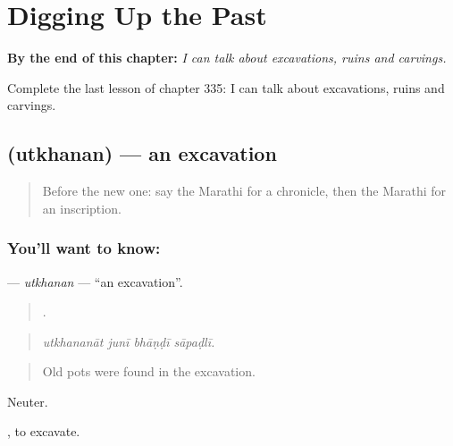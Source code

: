 
\chapter{Digging Up the Past}
\label{ch:mr-digging-up-the-past}

\begin{chapteropening}
\textbf{By the end of this chapter:} \emph{I can talk about excavations, ruins and carvings.}

Complete the last lesson of chapter 335: I can talk about excavations, ruins and carvings.
\end{chapteropening}

\section[\texorpdfstring{\mr{उत्खनन} (utkhanan)}{उत्खनन (utkhanan)}]{ (utkhanan) — an excavation}

\label{lesson:MR-C335-utkhanan}



\begin{quote}
Before the new one: say the Marathi for a chronicle, then the Marathi for an inscription.
\end{quote}

\subsection*{You'll want to know: }
\textbf{} — \emph{utkhanan} — \textquotedblleft{}an excavation\textquotedblright{}.

\begin{quote}
   .
\end{quote}

\begin{quote}
\emph{utkhananāt junī bhāṇḍī sāpaḍlī.}
\end{quote}

\begin{quote}
Old pots were found in the excavation.
\end{quote}

Neuter.

 , to excavate.

